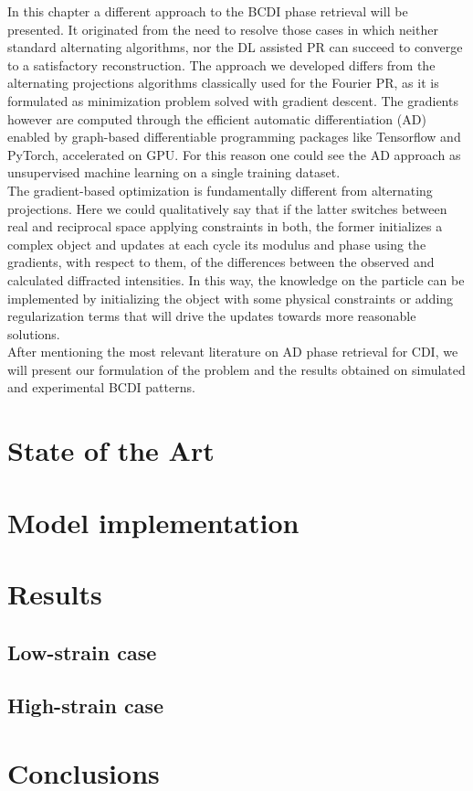 
In this chapter a different approach to the BCDI phase retrieval will be presented. It originated from the need to resolve 
those cases in which neither standard alternating algorithms, nor the DL assisted PR can succeed to converge to a satisfactory 
reconstruction. The approach we developed differs from the alternating projections algorithms classically used for 
the Fourier PR, as it is formulated as minimization problem solved with gradient descent. The gradients however are computed 
through the efficient automatic differentiation (AD) enabled by graph-based differentiable programming packages like Tensorflow and 
PyTorch, accelerated on GPU. For this reason one could see the AD approach as unsupervised machine learning on a single training 
dataset.\\ 
The gradient-based optimization is fundamentally different from alternating projections. Here we could qualitatively say 
that if the latter switches between real and reciprocal space applying constraints in both, the former initializes a 
complex object and updates at each cycle its modulus and phase using the gradients, with respect to them, of the differences 
between the observed and calculated diffracted intensities. In this way, the knowledge on the particle can be implemented 
by initializing the object with some physical constraints or adding regularization terms that will drive the updates 
towards more reasonable solutions. \\

After mentioning the most relevant literature on AD phase retrieval for CDI, we will present our formulation of the problem 
and the results obtained on simulated and experimental BCDI patterns. 


\section{State of the Art}
\section{Model implementation}

\section{Results}
\subsection{Low-strain case}
\subsection{High-strain case}
\section{Conclusions}
